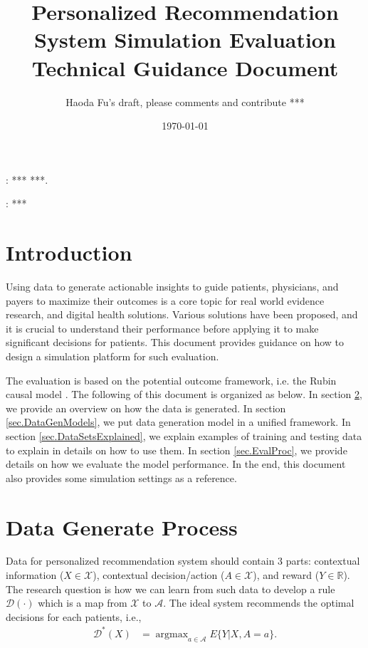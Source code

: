 \documentclass[12pt]{article}
\DeclareMathOperator*{\argmax}{argmax}
\def\cal{\mathcal}
\def\calA{{\cal A}} %
\def\calX{{\cal X}} %
\def\calD{{\cal D}} %
\def\bbR{{\mathbb{R}}} %
\begin{document}
\title
{\bf Personalized Recommendation System Simulation Evaluation Technical Guidance Document}
\author
{
	Haoda Fu's draft, please comments and contribute *** \\
}
\date{\today}
\maketitle
\begin{abstract}
	
\end{abstract}

: *** ***.

: ***


\newpage

\section{Introduction}
Using data to generate actionable insights to guide patients, physicians, and payers to maximize their outcomes is a core topic for real world evidence research, and digital health solutions.  Various solutions have been proposed, and it is crucial to understand their performance before applying it to make significant decisions for patients. This document provides guidance on how to design a simulation platform for such evaluation. 

The evaluation is based on the potential outcome framework, i.e. the Rubin causal model  \cite{holland1986statistics}.  The following of this document is organized as below. In section \ref{sec.DataGenProc}, we provide an overview on how the data is generated. In section \ref{sec.DataGenModels}, we put data generation model in a unified framework.
In section \ref{sec.DataSetsExplained}, we explain examples of training and testing data to explain in details on how to use them. In section \ref{sec.EvalProc}, we provide details on how we evaluate the model performance.  In the end, this document also provides some simulation settings as a reference. 

\section{Data Generate Process} \label{sec.DataGenProc}
Data for personalized recommendation system should contain 3 parts: contextual information ($X \in \calX $), contextual decision/action ($A \in \calX $), and reward ($Y \in \bbR $). The research question is how we can learn from such data to develop a rule $\calD(\cdot)$ which is a map from $\calX$ to $\calA$.  The ideal system recommends the optimal decisions for each patients, i.e.,
\begin{align*}
\calD^*(X) & = \argmax_{a \in \calA}  E\{Y|X, A=a\}.
\end{align*} 
\end{document}
